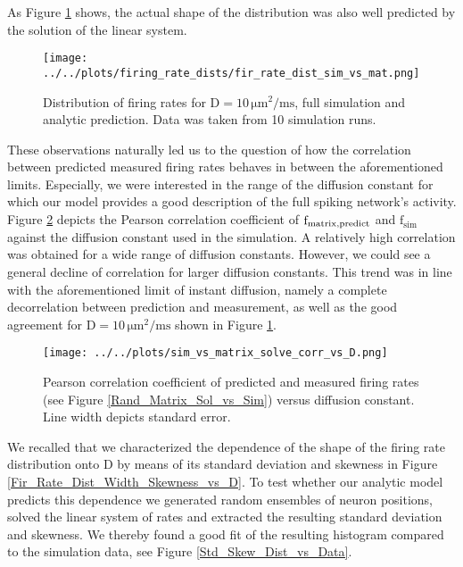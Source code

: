 \documentclass[10pt,a4paper]{article}
\begin{document}
As Figure \ref{Fir_Rate_Dist_Sim_vs_Mat} shows, the actual shape of the distribution was also well predicted by the solution of the linear system.
\begin{figure}
\begin{center}
\texttt{[image: ../../plots/firing\_rate\_dists/fir\_rate\_dist\_sim\_vs\_mat.png]}
\end{center}
\caption{Distribution of firing rates for $\mathrm{D=10\, \mu m^2 / ms}$, full simulation and analytic prediction. Data was taken from 10 simulation runs.}
\label{Fir_Rate_Dist_Sim_vs_Mat}
\end{figure}
These observations naturally led us to the question of how the correlation between predicted measured firing rates behaves in between the aforementioned limits. Especially, we were interested in the range of the diffusion constant for which our model provides a good description of the full spiking network's activity. Figure \ref{Corr_Coeff_vs_D} depicts the Pearson correlation coefficient of $\mathrm{f_{matrix \\, predict}}$ and $\mathrm{f_{sim}}$ against the diffusion constant used in the simulation. A relatively high correlation was obtained for a wide range of diffusion constants. However, we could see a general decline of correlation for larger diffusion constants. This trend was in line with the aforementioned limit of instant diffusion, namely a complete decorrelation between prediction and measurement, as well as the good agreement for $\mathrm{D= 10\, \mu m^2 / ms}$ shown in Figure \ref{Fir_Rate_Dist_Sim_vs_Mat}.
\begin{figure}
\begin{center}
\texttt{[image: ../../plots/sim\_vs\_matrix\_solve\_corr\_vs\_D.png]}
\end{center}
\caption{Pearson correlation coefficient of predicted and measured firing rates (see Figure \ref{Rand_Matrix_Sol_vs_Sim}) versus diffusion constant. Line width depicts standard error.}
\label{Corr_Coeff_vs_D}
\end{figure}
We recalled that we characterized the dependence of the shape of the firing rate distribution onto $\mathrm{D}$ by means of its standard deviation and skewness in Figure \ref{Fir_Rate_Dist_Width_Skewness_vs_D}. To test whether our analytic model predicts this dependence we generated random ensembles of neuron positions, solved the linear system of rates and extracted the resulting standard deviation and skewness. We thereby found a good fit of the resulting histogram compared to the simulation data, see Figure \ref{Std_Skew_Dist_vs_Data}.
\end{document}
